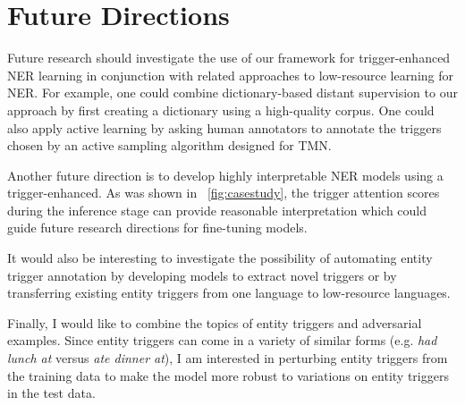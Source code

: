 




\section{Future Directions}
Future research should investigate the use of our framework for trigger-enhanced NER learning in conjunction with related approaches to low-resource learning for NER. 
For example, one could combine dictionary-based distant supervision to our approach by first creating a dictionary using a high-quality corpus. One could also apply active learning by asking human annotators to annotate the triggers chosen by an active sampling algorithm designed for TMN.

Another future direction is to develop highly interpretable NER models using a trigger-enhanced. As was shown in ~\ref{fig:casestudy}, the trigger attention scores during the inference stage can provide reasonable interpretation which could guide future research directions for fine-tuning models. 

It would also be interesting to investigate the possibility of automating entity trigger annotation by developing models to extract novel triggers or by transferring existing entity triggers from one language to low-resource languages.

Finally, I would like to combine the topics of entity triggers and adversarial examples. Since entity triggers can come in a  variety of similar forms (e.g. \textit{had lunch at} versus \textit{ate  dinner  at}), I am interested in perturbing entity triggers from the training data to make the model more robust to variations on entity triggers in the test data.
